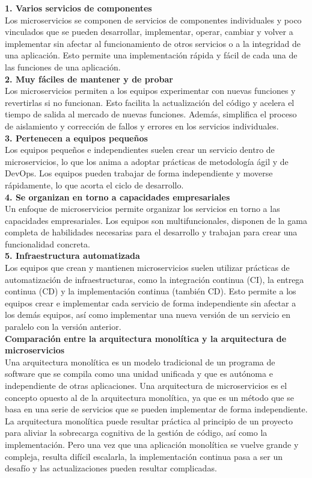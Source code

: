 \documentclass[12pt,letterpaper]{article}
\begin{document}
\textbf{1. Varios servicios de componentes} \\
Los microservicios se componen de servicios de componentes individuales y poco vinculados que se pueden desarrollar, implementar, operar, cambiar y volver a implementar sin afectar al funcionamiento de otros servicios o a la integridad de una aplicación. Esto permite una implementación rápida y fácil de cada una de las funciones de una aplicación. \\
\textbf{2. Muy fáciles de mantener y de probar} \\
Los microservicios permiten a los equipos experimentar con nuevas funciones y revertirlas si no funcionan. Esto facilita la actualización del código y acelera el tiempo de salida al mercado de nuevas funciones. Además, simplifica el proceso de aislamiento y corrección de fallos y errores en los servicios individuales. \\
\textbf{3. Pertenecen a equipos pequeños} \\
Los equipos pequeños e independientes suelen crear un servicio dentro de microservicios, lo que los anima a adoptar prácticas de metodología ágil y de DevOps. Los equipos pueden trabajar de forma independiente y moverse rápidamente, lo que acorta el ciclo de desarrollo. \\
\textbf{4. Se organizan en torno a capacidades empresariales} \\
Un enfoque de microservicios permite organizar los servicios en torno a las capacidades empresariales. Los equipos son multifuncionales, disponen de la gama completa de habilidades necesarias para el desarrollo y trabajan para crear una funcionalidad concreta. \\
\textbf{5. Infraestructura automatizada} \\
Los equipos que crean y mantienen microservicios suelen utilizar prácticas de automatización de infraestructuras, como la integración continua (CI), la entrega continua (CD) y la implementación continua (también CD). Esto permite a los equipos crear e implementar cada servicio de forma independiente sin afectar a los demás equipos, así como implementar una nueva versión de un servicio en paralelo con la versión anterior.\\

\textbf{Comparación entre la arquitectura monolítica y la arquitectura de microservicios} \\
Una arquitectura monolítica es un modelo tradicional de un programa de software que se compila como una unidad unificada y que es autónoma e independiente de otras aplicaciones. Una arquitectura de microservicios es el concepto opuesto al de la arquitectura monolítica, ya que es un método que se basa en una serie de servicios que se pueden implementar de forma independiente. La arquitectura monolítica puede resultar práctica al principio de un proyecto para aliviar la sobrecarga cognitiva de la gestión de código, así como la implementación. Pero una vez que una aplicación monolítica se vuelve grande y compleja, resulta difícil escalarla, la implementación continua pasa a ser un desafío y las actualizaciones pueden resultar complicadas.\\
\end{document}
